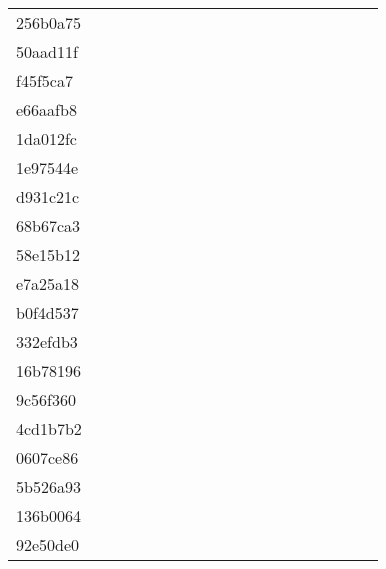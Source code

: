 \begin{table*}[htb]
\begin{tabular}{l|cccccccccccccccccc}
256b0a75  & \X & \X & \X & \X & \X & \X & \X & \X & \X & \X & \X & \X & \X & \X & \X & \X & \X \\
50aad11f  & \C & \X & \X & \X & \X & \X & \X & \X & \X & \X & \X & \X & \X & \C & \C & \X & \X \\
f45f5ca7  & \C & \X & \C & \C & \C & \C & \C & \C & \C & \C & \C & \C & \C & \C & \C & \X & \X \\
e66aafb8  & \C & \X & \X & \X & \X & \X & \X & \C & \X & \X & \X & \C & \C & \C & \C & \C & \C \\
1da012fc  & \C & \X & \X & \X & \X & \X & \X & \X & \X & \X & \X & \X & \X & \C & \C & \C & \C \\
1e97544e  & \C & \X & \X & \X & \X & \C & \C & \X & \X & \X & \X & \X & \X & \C & \C & \C & \C \\
d931c21c  & \X & \X & \X & \X & \X & \X & \X & \X & \X & \X & \X & \X & \X & \X & \X & \X & \X \\
68b67ca3  & \C & \C & \C & \C & \C & \C & \C & \C & \C & \C & \C & \C & \C & \C & \C & \C & \C \\
58e15b12  & \C & \X & \X & \X & \X & \X & \X & \X & \X & \X & \X & \X & \X & \X & \C & \X & \X \\
e7a25a18  & \C & \X & \X & \X & \X & \C & \X & \C & \C & \X & \X & \X & \C & \C & \C & \C & \C \\
b0f4d537  & \C & \X & \X & \X & \X & \X & \X & \X & \X & \X & \X & \X & \X & \X & \C & \C & \C \\
332efdb3  & \C & \X & \C & \C & \C & \C & \C & \C & \C & \C & \C & \C & \C & \C & \C & \C & \C \\
16b78196  & \X & \X & \X & \X & \X & \X & \X & \X & \X & \X & \X & \X & \X & \X & \X & \X & \X \\
9c56f360  & \C & \X & \X & \X & \X & \X & \X & \C & \C & \C & \C & \C & \C & \C & \C & \C & \C \\
4cd1b7b2  & \C & \X & \C & \X & \X & \C & \C & \C & \C & \C & \C & \C & \C & \C & \C & \C & \C \\
0607ce86  & \C & \X & \X & \X & \X & \C & \C & \X & \X & \X & \X & \X & \X & \C & \C & \C & \C \\
5b526a93  & \C & \X & \X & \C & \X & \C & \X & \X & \X & \X & \X & \X & \X & \C & \C & \C & \C \\
136b0064  & \C & \X & \X & \X & \X & \X & \X & \X & \X & \X & \X & \X & \X & \X & \C & \X & \X \\
92e50de0  & \C & \X & \X & \X & \X & \X & \X & \X & \X & \X & \X & \X & \X & \C & \C & \X & \X \\

\end{tabular}
\end{table*}
